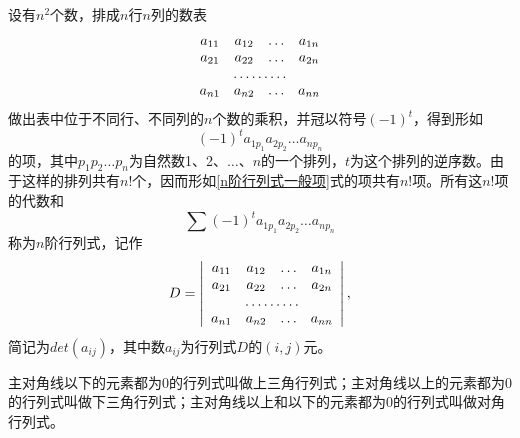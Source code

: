 \begin{定义}
	设有$ n^{2} $个数，排成$ n $行$ n $列的数表
	\begin{equation} \label{n阶数表}
		\begin{array}{cccc}
			a_{11} & a_{12} & \dots & a_{1n}\\
			a_{21} & a_{22} & \dots & a_{2n}\\
			\multicolumn{4}{c}{\dots\dots\dots}\\
			a_{n1} & a_{n2} & \dots & a_{nn}\\
		\end{array}
	\end{equation}
	做出表中位于不同行、不同列的$ n $个数的乘积，并冠以符号$ (-1)^{t} $，得到形如	
	\begin{equation}\label{n阶行列式一般项}
		(-1)^{t}a_{1p_{1}}a_{2p_{2}}\dots a_{np_{n}}
	\end{equation}
	\noindent 的项，其中$ p_{1}p_{2}\dots p_{n} $为自然数1、2、$ \dots $、$ n $的一个排列，$ t $为这个排列的逆序数。由于这样的排列共有$ n! $个，因而形如\ref{n阶行列式一般项}式的项共有$ n! $项。所有这$ n! $项的代数和	
	\begin{equation}
		\sum(-1)^{t}a_{1p_{1}}a_{2p_{2}}\dots a_{np_{n}}
	\end{equation}
	称为$ n $阶行列式，记作
	\begin{equation} \label{n阶行列式}
		D=\left |\begin{array}{cccc}
			a_{11} & a_{12} & \dots & a_{1n}\\
			a_{21} & a_{22} & \dots & a_{2n}\\
			\multicolumn{4}{c}{\dots\dots\dots}\\
			a_{n1} & a_{n2} & \dots & a_{nn}\\
		\end{array}\right |,
	\end{equation}
	简记为$ det(a_{ij}) $，其中数$ a_{ij} $为行列式$ D $的$ (i,j) $元。
\end{定义}

主对角线以下的元素都为0的行列式叫做上三角行列式；主对角线以上的元素都为0的行列式叫做下三角行列式；主对角线以上和以下的元素都为0的行列式叫做对角行列式。

